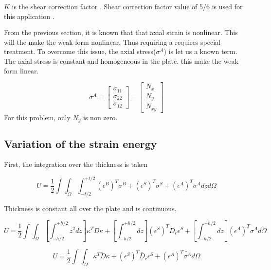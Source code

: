 \documentclass[main.tex]{subfiles}
\begin{document}
$K$ is the shear correction factor \cite{StatAndDynaforshearcorrect}. Shear correction factor value of 5/6 is used for this application \cite{WANG1999467}.

From the previous section, it is known that that axial strain is nonlinear. This will the make the weak form nonlinear. Thus requiring a requires special treatment. To overcome this issue, the axial stress($\sigma^A$) is let us a known term. The axial stress is constant and homogeneous in the plate. this make the weak form linear.

\begin{equation}
\sigma^A = \begin{bmatrix}
\sigma_{11}
\\
\sigma_{22}
\\
\sigma_{12}
\end{bmatrix}
=
\begin{bmatrix}
N_x
\\
N_y
\\
N_{xy}
\end{bmatrix}
\end{equation}
For this problem, only $N_y$ is non zero. 


\subsection{Variation of the strain energy}

First, the integration over the thickness is taken  

\begin{equation}
U=\frac{1}{2} \int\int_\Omega \int_{-t/2}^{+t/2} \left(\epsilon^B\right)^T \sigma^B + \left(\epsilon^S\right)^T \sigma^S + \left(\epsilon^A\right)^T \sigma^A dz d \Omega
\end{equation}

Thickness is constant all over the plate and is continuous.

\begin{equation}
U=\frac{1}{2} \int\int_\Omega \left[ \int_{-h/2}^{+h/2} z^2 dz\right] \kappa^T {D} \kappa 
+ \left[ \int_{-h/2}^{+h/2} dz\right]\left(\epsilon^S\right)^T {D_c} \epsilon^S 
+ \left[ \int_{-h/2}^{+h/2} dz\right]
 \left(\epsilon^A\right)^T \sigma^A  d \Omega
\end{equation}


\begin{equation}
U=\frac{1}{2} \int\int_\Omega 
\kappa^T \tilde{D} \kappa 
+ 
\left(\epsilon^S\right)^T \tilde{D_c} \epsilon^S 
+ 
 \left(\epsilon^A\right)^T \tilde{\sigma^A}  d \Omega
\end{equation}
\end{document}
